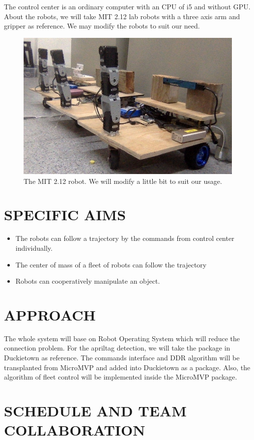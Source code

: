 \documentclass[letterpaper, 10 pt, conference]{ieeeconf}  %
\begin{document}
The control center is an ordinary computer with an CPU of i5 and without GPU. About the robots, we will take MIT 2.12 lab robots with a three axis arm and gripper as reference. We may modify the robots to suit our need.
\begin{figure}[h] %
\includegraphics[width=0.8\columnwidth]{robot}
\centering
\caption{The MIT 2.12 robot. We will modify a little bit to suit our usage.}
 \label{figure:robot}
\end{figure}

\section{SPECIFIC AIMS}

\begin{itemize}
\item The robots can follow a trajectory by the commands from control center individually.
\item The center of mass of a fleet of robots can follow the trajectory
\item Robots can cooperatively manipulate an object.
\end{itemize}

\section{APPROACH}

The whole system will base on Robot Operating System which will reduce the connection problem. For the apriltag detection, we will take the package in Duckietown as reference. The commands interface and DDR algorithm will be transplanted from MicroMVP and added into Duckietown as a package. Also, the algorithm of fleet control will be implemented inside the MicroMVP package. 

\section{SCHEDULE AND TEAM COLLABORATION}
\end{document}
